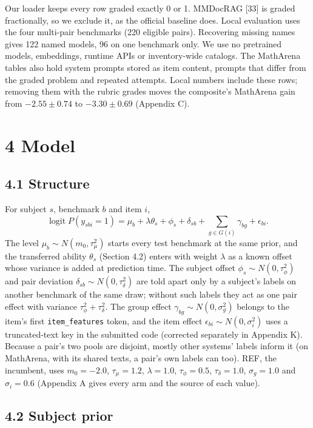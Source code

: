 \documentclass[
]{article}
\begin{document}
Our loader keeps every row graded exactly 0 or 1. MMDocRAG {[}33{]} is
graded fractionally, so we exclude it, as the official baseline does.
Local evaluation uses the four multi-pair benchmarks (220 eligible
pairs). Recovering missing names gives 122 named models, 96 on one
benchmark only. We use no pretrained models, embeddings, runtime APIs or
inventory-wide catalogs. The MathArena tables also hold system prompts
stored as item content, prompts that differ from the graded problem and
repeated attempts. Local numbers include these rows; removing them with
the rubric grades moves the composite's MathArena gain from
\(-2.55 \pm 0.74\) to \(-3.30 \pm 0.69\) (Appendix C).

\section{4 Model}\label{model}

\subsection{4.1 Structure}\label{structure}

For subject \(s\), benchmark \(b\) and item \(i\),
\[\operatorname{logit} P(y_{sbi} = 1) = \mu_b + \lambda\theta_s + \phi_s + \delta_{sb} + \sum_{g \in G(i)} \gamma_{bg} + \epsilon_{bi}.\]
The level \(\mu_b \sim N(m_0, \tau_\mu^2)\) starts every test benchmark
at the same prior, and the transferred ability \(\theta_s\) (Section
4.2) enters with weight \(\lambda\) as a known offset whose variance is
added at prediction time. The subject offset
\(\phi_s \sim N(0, \tau_\phi^2)\) and pair deviation
\(\delta_{sb} \sim N(0, \tau_\delta^2)\) are told apart only by a
subject's labels on another benchmark of the same draw; without such
labels they act as one pair effect with variance
\(\tau_\phi^2 + \tau_\delta^2\). The group effect
\(\gamma_{bg} \sim N(0,
\sigma_g^2)\) belongs to the item's first \texttt{item\_features} token,
and the item effect \(\epsilon_{bi} \sim N(0,
\sigma_i^2)\) uses a truncated-text key in the submitted code (corrected
separately in Appendix K). Because a pair's two pools are disjoint,
mostly other systems' labels inform it (on MathArena, with its shared
texts, a pair's own labels can too). REF, the incumbent, uses
\(m_0 = -2.0\), \(\tau_\mu = 1.2\), \(\lambda = 1.0\),
\(\tau_\phi = 0.5\), \(\tau_\delta = 1.0\), \(\sigma_g = 1.0\) and
\(\sigma_i = 0.6\) (Appendix A gives every arm and the source of each
value).

\subsection{4.2 Subject prior}\label{subject-prior}
\end{document}
